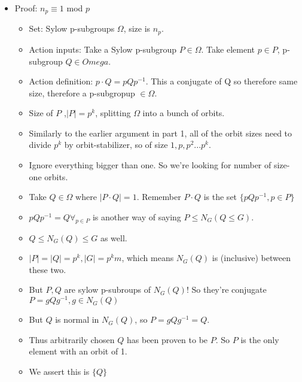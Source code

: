 \documentclass[11pt, oneside]{article}   	%
\begin{document}
\begin{itemize}
\item Proof: $n_p \equiv 1$ mod $p$
\begin{itemize}
\item Set: Sylow p-subgroups $\Omega$, size is $n_p$.
\item Action inputs: Take a Sylow p-subgroup $P \in \Omega$.  Take element $p \in P$, p-subgroup $Q \in Omega$.  
\item Action definition: $p \cdot Q = pQp^{-1}$.  This a conjugate of Q so therefore same size, therefore a p-subgropup $\in \Omega$.
\item Size of $P$ ,$|P| = p^k$, splitting $\Omega$ into a bunch of orbits.
\item Similarly to the earlier argument in part 1, all of the orbit sizes need to divide $p^k$ by orbit-stabilizer, so of size $1, p, p^2... p^k$.  
\item Ignore everything bigger than one.  So we're looking for number of size-one orbits.
\item Take $Q \in \Omega$ where $|P \cdot Q| = 1$.  Remember $ P \cdot Q$ is the set $\{pQp^{-1}, p \in P\}$
\item $pQp^{-1} = Q \forall_{p \in P}$ is another way of saying $P \leq N_G(Q \leq G)$.
\item $Q \leq N_G(Q) \leq G$ as well.  
\item $|P| = |Q| = p^k, |G| = p^km$, which means $N_G(Q)$ is (inclusive) between these two.
\item But $P, Q$ are sylow p-subroups of $N_G(Q)$!  So they're conjugate $P = gQg^{-1}, g \in N_G(Q)$
\item But $Q$ is normal in $N_G(Q)$, so $P = gQg^{-1} = Q$.  
\item Thus arbitrarily chosen $Q$ has been proven to be $P$.  So $P$ is the only element with an orbit of 1.
\item We assert this is $\{Q\}$

\end{itemize}
\end{itemize}
\end{document}
